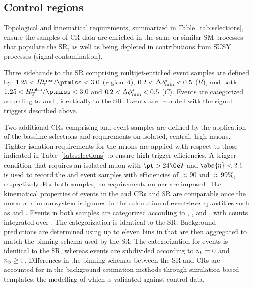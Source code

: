 
\subsection{Control regions}
\label{sec:control}

Topological and kinematical requirements, summarized in
Table~\ref{tab:selections}, ensure the samples of CR data are enriched
in the same or similar SM processes that populate the SR, as well as
being depleted in contributions from SUSY processes (signal
contamination).

Three sidebands to the SR comprising multijet-enriched event samples
are defined by: $1.25 < \mhtmet < 3.0$ (region $A$), $0.2 < \Delta\phi^{*}_\text{min} <
0.5$ ($B$), and both $1.25 < \mhtmet < 3.0$ and $0.2 < \Delta\phi^{*}_\text{min} < 0.5$
($C$). Events are categorized according to \njet and \scalht,
identically to the SR. 
Events are recorded with the signal triggers described above.

Two additional CRs comprising \mj and \mmj event samples are defined
by the application of the baseline selections and requirements on
isolated, central, high-\pt muons. Tighter isolation requirements for
the muons are applied with respect to those indicated in
Table~\ref{tab:selections} to ensure high trigger efficiencies. A
trigger condition that requires an isolated muon with $\pt > 24\GeV$
and $\abs{\eta} < 2.1$ is used to record the \mj and \mmj event
samples with efficiencies of ${\approx}90$ and ${\approx}99\%$,
respectively. For both samples, no requirements on \alphat nor \bdphi
are imposed. The kinematical properties of events in the \mj and \mmj
CRs and SR are comparable once the muon or dimuon system is ignored in
the calculation of event-level quantities such as \scalht and \mht.
Events in both samples are categorized according to \njet, \scalht,
and \nb, with counts integrated over \mht. The \njet categorization is
identical to the SR. Background predictions are determined using up to
eleven bins in \scalht that are then aggregated to match the \scalht
binning schema used by the SR. 
The \nb categorization for \mj events is identical to the SR, whereas
\mmj events are subdivided according to $n_{\text{b}} = 0$ and $n_{\text{b}} \geq
1$. Differences in the binning schemas between the SR and CRs are
accounted for in the background estimation methods through
simulation-based templates, the modelling of which is validated
against control data.

